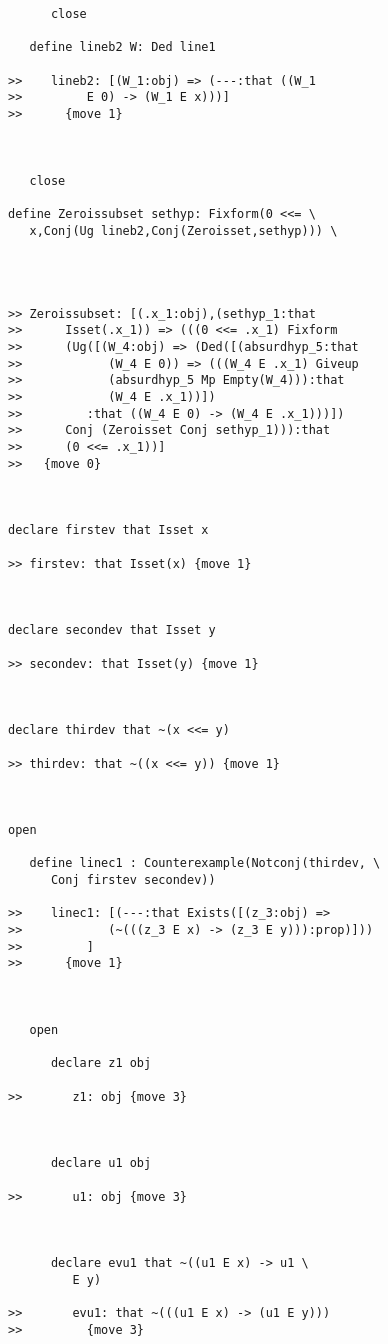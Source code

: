 \documentclass[12pt]{article}
\begin{document}
\begin{verbatim}
      close

   define lineb2 W: Ded line1

>>    lineb2: [(W_1:obj) => (---:that ((W_1
>>         E 0) -> (W_1 E x)))]
>>      {move 1}



   close

define Zeroissubset sethyp: Fixform(0 <<= \
   x,Conj(Ug lineb2,Conj(Zeroisset,sethyp))) \
   



>> Zeroissubset: [(.x_1:obj),(sethyp_1:that
>>      Isset(.x_1)) => (((0 <<= .x_1) Fixform
>>      (Ug([(W_4:obj) => (Ded([(absurdhyp_5:that
>>            (W_4 E 0)) => (((W_4 E .x_1) Giveup
>>            (absurdhyp_5 Mp Empty(W_4))):that
>>            (W_4 E .x_1))])
>>         :that ((W_4 E 0) -> (W_4 E .x_1)))])
>>      Conj (Zeroisset Conj sethyp_1))):that
>>      (0 <<= .x_1))]
>>   {move 0}



declare firstev that Isset x

>> firstev: that Isset(x) {move 1}



declare secondev that Isset y

>> secondev: that Isset(y) {move 1}



declare thirdev that ~(x <<= y)

>> thirdev: that ~((x <<= y)) {move 1}



open

   define linec1 : Counterexample(Notconj(thirdev, \
      Conj firstev secondev))

>>    linec1: [(---:that Exists([(z_3:obj) =>
>>            (~(((z_3 E x) -> (z_3 E y))):prop)]))
>>         ]
>>      {move 1}



   open

      declare z1 obj

>>       z1: obj {move 3}



      declare u1 obj

>>       u1: obj {move 3}



      declare evu1 that ~((u1 E x) -> u1 \
         E y)

>>       evu1: that ~(((u1 E x) -> (u1 E y)))
>>         {move 3}




\end{verbatim}
\end{document}

